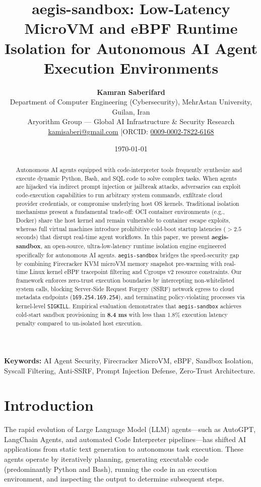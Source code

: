 \documentclass[11pt,a4paper]{article}
\title{\Large\bfseries aegis-sandbox: Low-Latency MicroVM and eBPF Runtime Isolation for Autonomous AI Agent Execution Environments}
\author{
    \textbf{Kamran Saberifard}\\[4pt]
    Department of Computer Engineering (Cybersecurity), MehrAstan University, Guilan, Iran\\
    Aryorithm Group — Global AI Infrastructure \& Security Research\\
    \href{mailto:kamisaberi@gmail.com}{kamisaberi@gmail.com} \quad|\quad ORCID: \href{https://orcid.org/0009-0002-7822-6168}{0009-0002-7822-6168}
}
\date{\today}
\begin{document}
\maketitle

\begin{abstract}
\noindent Autonomous AI agents equipped with code-interpreter tools frequently synthesize and execute dynamic Python, Bash, and SQL code to solve complex tasks. When agents are hijacked via indirect prompt injection or jailbreak attacks, adversaries can exploit code-execution capabilities to run arbitrary system commands, exfiltrate cloud provider credentials, or compromise underlying host OS kernels. Traditional isolation mechanisms present a fundamental trade-off: OCI container environments (e.g., Docker) share the host kernel and remain vulnerable to container escape exploits, whereas full virtual machines introduce prohibitive cold-boot startup latencies ($>2.5$ seconds) that disrupt real-time agent workflows. In this paper, we present \textbf{aegis-sandbox}, an open-source, ultra-low-latency runtime isolation engine engineered specifically for autonomous AI agents. \texttt{aegis-sandbox} bridges the speed-security gap by combining Firecracker KVM microVM memory snapshot pre-warming with real-time Linux kernel eBPF tracepoint filtering and Cgroups v2 resource constraints. Our framework enforces zero-trust execution boundaries by intercepting non-whitelisted system calls, blocking Server-Side Request Forgery (SSRF) network egress to cloud metadata endpoints (\texttt{169.254.169.254}), and terminating policy-violating processes via kernel-level \texttt{SIGKILL}. Empirical evaluation demonstrates that \texttt{aegis-sandbox} achieves cold-start sandbox provisioning in \textbf{8.4 ms} with less than 1.8\% execution latency penalty compared to un-isolated host execution.
\end{abstract}

\vspace{6pt}
\noindent\textbf{Keywords:} AI Agent Security, Firecracker MicroVM, eBPF, Sandbox Isolation, Syscall Filtering, Anti-SSRF, Prompt Injection Defense, Zero-Trust Architecture.

\hr

\section{Introduction}
The rapid evolution of Large Language Model (LLM) agents—such as AutoGPT, LangChain Agents, and automated Code Interpreter pipelines—has shifted AI applications from static text generation to autonomous task execution. These agents operate by iteratively planning, generating executable code (predominantly Python and Bash), running the code in an execution environment, and inspecting the output to determine subsequent steps.
\end{document}
